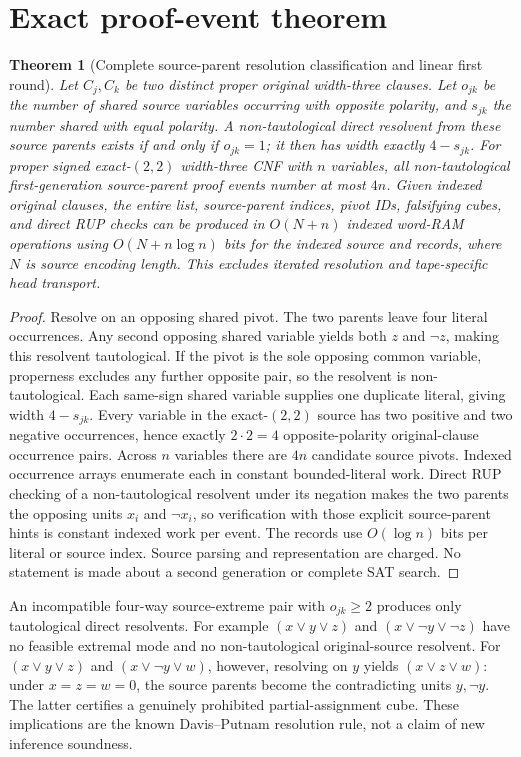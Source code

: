 \documentclass[11pt]{article}
\newtheorem{theorem}{Theorem}
\begin{document}
\section{Exact proof-event theorem}
\begin{theorem}[Complete source-parent resolution classification and linear first round]
Let $C_j,C_k$ be two distinct proper original width-three clauses. Let $o_{jk}$ be the number of shared source variables occurring with opposite polarity, and $s_{jk}$ the number shared with equal polarity. A non-tautological direct resolvent from these source parents exists if and only if $o_{jk}=1$; it then has width exactly $4-s_{jk}$. For proper signed exact-$(2,2)$ width-three CNF with $n$ variables, all non-tautological \emph{first-generation source-parent proof events} number at most $4n$. Given indexed original clauses, the entire list, source-parent indices, pivot IDs, falsifying cubes, and direct RUP checks can be produced in $O(N+n)$ indexed word-RAM operations using $O(N+n\log n)$ bits for the indexed source and records, where $N$ is source encoding length. This excludes iterated resolution and tape-specific head transport.
\end{theorem}
\begin{proof}
Resolve on an opposing shared pivot. The two parents leave four literal occurrences. Any second opposing shared variable yields both $z$ and $\neg z$, making this resolvent tautological. If the pivot is the sole opposing common variable, properness excludes any further opposite pair, so the resolvent is non-tautological. Each same-sign shared variable supplies one duplicate literal, giving width $4-s_{jk}$. Every variable in the exact-$(2,2)$ source has two positive and two negative occurrences, hence exactly $2\cdot2=4$ opposite-polarity original-clause occurrence pairs. Across $n$ variables there are $4n$ candidate source pivots. Indexed occurrence arrays enumerate each in constant bounded-literal work. Direct RUP checking of a non-tautological resolvent under its negation makes the two parents the opposing units $x_i$ and $\neg x_i$, so verification with those explicit source-parent hints is constant indexed work per event. The records use $O(\log n)$ bits per literal or source index. Source parsing and representation are charged. No statement is made about a second generation or complete SAT search.
\end{proof}

An incompatible four-way source-extreme pair with $o_{jk}\ge2$ produces only tautological direct resolvents. For example $(x\vee y\vee z)$ and $(x\vee\neg y\vee\neg z)$ have no feasible extremal mode and no non-tautological original-source resolvent. For $(x\vee y\vee z)$ and $(x\vee\neg y\vee w)$, however, resolving on $y$ yields $(x\vee z\vee w)$: under $x=z=w=0$, the source parents become the contradicting units $y,\neg y$. The latter certifies a genuinely prohibited partial-assignment cube. These implications are the known Davis--Putnam resolution rule, not a claim of new inference soundness.
\end{document}
